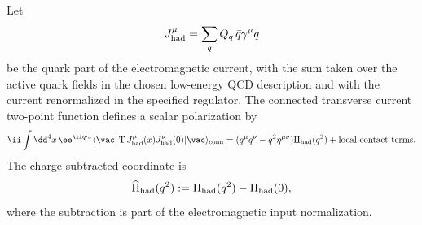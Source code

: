\begin{definition}
\label{def:sm-muon-hvp-current-data}
Let
\begin{equation}
  J_{\rm had}^\mu
  =
  \sum_{q} Q_q\,\bar q\gamma^\mu q
  \label{eq:sm-hadronic-em-current}
\end{equation}
be the quark part of the electromagnetic current, with the sum taken over the
active quark fields in the chosen low-energy QCD description and with the
current renormalized in the specified regulator.  The connected transverse
current two-point function defines a scalar polarization by
\begin{equation}
  \ii\int \dd^4x\,\ee^{\ii q\cdot x}
  \langle\vac|\operatorname T J_{\rm had}^\mu(x)J_{\rm had}^\nu(0)|\vac\rangle_{\rm conn}
  =
  (q^\mu q^\nu-q^2\eta^{\mu\nu})\Pi_{\rm had}(q^2)
  +\text{local contact terms}.
  \label{eq:sm-hvp-lorentzian-polarization}
\end{equation}
The charge-subtracted coordinate is
\begin{equation}
  \widehat\Pi_{\rm had}(q^2):=\Pi_{\rm had}(q^2)-\Pi_{\rm had}(0),
  \label{eq:sm-hvp-subtracted-pi}
\end{equation}
where the subtraction is part of the electromagnetic input normalization.
\end{definition}

